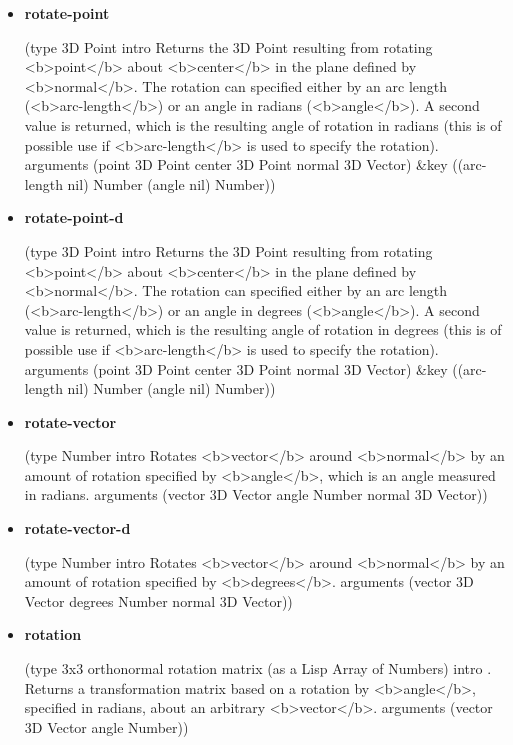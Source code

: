 \documentclass [11pt]{book}
\begin{document}
\begin{itemize}
\item {}
\label{prim:rotate-point}
\textbf{rotate-point}

(type 3D Point intro
  Returns the 3D Point resulting from rotating <b>point</b> about
<b>center</b> in the plane defined by <b>normal</b>. The rotation can specified
either by an arc length (<b>arc-length</b>) or an angle in radians (<b>angle</b>).
A second value is returned, which is the resulting angle of rotation in radians (this
is of possible use if <b>arc-length</b> is used to specify the rotation).
 arguments (point 3D Point center 3D Point normal 3D Vector) \&key
 ((arc-length nil) Number (angle nil) Number))



\item {}
\label{prim:rotate-point-d}
\textbf{rotate-point-d}

(type 3D Point intro
  Returns the 3D Point resulting from rotating <b>point</b> about
<b>center</b> in the plane defined by <b>normal</b>. The rotation can specified
either by an arc length (<b>arc-length</b>) or an angle in degrees (<b>angle</b>).
A second value is returned, which is the resulting angle of rotation in degrees (this
is of possible use if <b>arc-length</b> is used to specify the rotation).
 arguments (point 3D Point center 3D Point normal 3D Vector) \&key
 ((arc-length nil) Number (angle nil) Number))



\item {}
\label{prim:rotate-vector}
\textbf{rotate-vector}

(type Number intro
  Rotates <b>vector</b> around <b>normal</b> by an amount of rotation
specified by <b>angle</b>, which is an angle measured in radians.
 arguments (vector 3D Vector angle Number normal 3D Vector))



\item {}
\label{prim:rotate-vector-d}
\textbf{rotate-vector-d}

(type Number intro
  Rotates <b>vector</b> around <b>normal</b> by an amount of rotation
specified by <b>degrees</b>.
 arguments (vector 3D Vector degrees Number normal 3D Vector))



\item {}
\label{prim:rotation}
\textbf{rotation}

(type 3x3 orthonormal rotation matrix (as a Lisp Array of Numbers)
 intro .
Returns a transformation matrix based on a rotation by <b>angle</b>,
specified in radians, about an arbitrary <b>vector</b>.
 arguments (vector 3D Vector angle Number))




\end{itemize}
\end{document}

